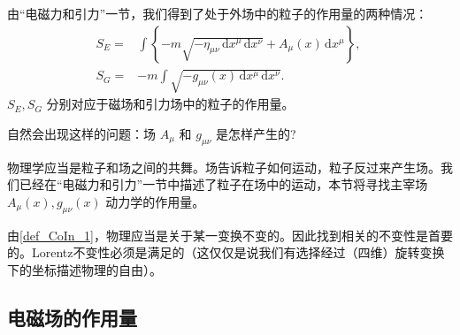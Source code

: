 

由“电磁力和引力”一节，我们得到了处于外场中的粒子的作用量的两种情况：
\begin{equation}
\begin{aligned}
S_E=&\int \left\{-m\sqrt{-\eta_{\mu\nu} \,\mathrm{d}{x} ^\mu \,\mathrm{d}{x} ^\nu}+A_\mu(x) \,\mathrm{d}{x} ^\mu \right\} ,\\
S_G=&-m\int\sqrt{-g_{\mu\nu}(x) \,\mathrm{d}{x} ^\mu \,\mathrm{d}{x} ^\nu}.
\end{aligned}~
\end{equation}
 $S_E,S_G$ 分别对应于磁场和引力场中的粒子的作用量。

自然会出现这样的问题：场 $A_\mu$ 和 $g_{\mu\nu}$ 是怎样产生的?

物理学应当是粒子和场之间的共舞。场告诉粒子如何运动，粒子反过来产生场。我们已经在“电磁力和引力”一节中描述了粒子在场中的运动，本节将寻找主宰场 $A_\mu(x),g_{\mu\nu}(x)$ 动力学的作用量。

由\autoref{def_CoIn_1}，物理应当是关于某一变换不变的。因此找到相关的不变性是首要的。Lorentz不变性必须是满足的（这仅仅是说我们有选择经过（四维）旋转变换下的坐标描述物理的自由）。

\subsection{电磁场的作用量}







